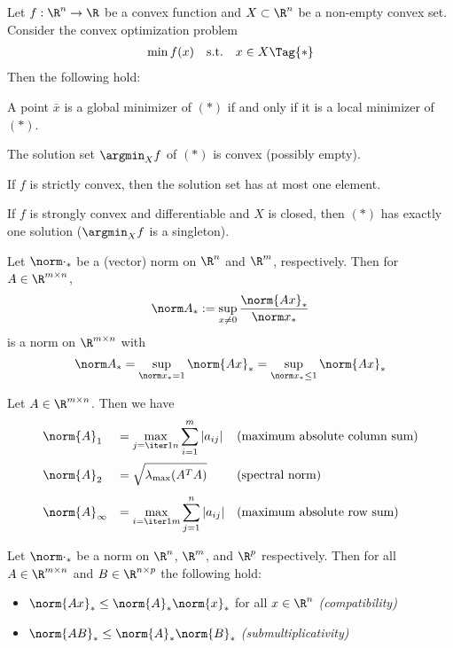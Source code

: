 Let $f:\R^n\to\R$ be a convex function and $X\subset\R^n$ be a non-empty convex
set. Consider the convex optimization problem
\begin{equation*}
  \begin{array}{l l l}
    \min f(x) & \text{s.t.} & x\in X\Tag{*}
  \end{array}
\end{equation*}
Then the following hold:
\begin{enumerata}
  \item A point $\bar x$ is a global minimizer of $(*)$ if and only if it is a local
  minimizer of $(*)$.
  \item The solution set $\argmin_Xf$ of $(*)$ is convex (possibly empty).
  \item If $f$ is strictly convex, then the solution set has at most one element.
  \item If $f$ is strongly convex and differentiable and $X$ is closed, then $(*)$ has
  exactly one solution ($\argmin_Xf$ is a singleton).
\end{enumerata}

\label{bad47a4}

Let $\norm\cdot_*$ be a (vector) norm on $\R^n$ and $\R^m$, respectively. Then
for $A\in\R^{m\times n}$,
$$
  \norm A_*:=\sup_{x\neq0}\frac{\norm{Ax}_*}{\norm x_*}
$$
is a norm on $\R^{m\times n}$ with
$$
  \norm A_*=\sup_{\norm x_*=1}\norm{Ax}_*=\sup_{\norm x_*\leq1}\norm{Ax}_*
$$

\label{ab2107f}

Let $A\in\R^{m\times n}$. Then we have
$$
  \begin{array}{l l l}
    \norm{A}_1      & = \displaystyle\max_{j=\iter1n}\sum_{i=1}^m|a_{ij}| & \text{(maximum absolute column sum)} \\[1.5em]
    \norm{A}_2      & = \displaystyle\sqrt{\lambda_{\max}(A^TA)}          & \text{(spectral norm)}               \\[1em]
    \norm{A}_\infty & = \displaystyle\max_{i=\iter1m}\sum_{j=1}^n|a_{ij}| & \text{(maximum absolute row sum)}
  \end{array}
$$

\label{dd47a09}

Let $\norm\cdot_*$ be a norm on $\R^n$, $\R^m$, and $\R^p$ respectively. Then
for all $A\in\R^{m\times n}$ and $B\in\R^{n\times p}$ the following hold:
\begin{itemize}
  \def\nm#1{\norm{#1}_*}
  \item $\nm{Ax}\leq\nm A\nm x$ for all $x\in\R^n$ \quad \textit{(compatibility)}
  \item $\nm{AB}\leq\nm A\nm B$ \quad \textit{(submultiplicativity)}
\end{itemize}

